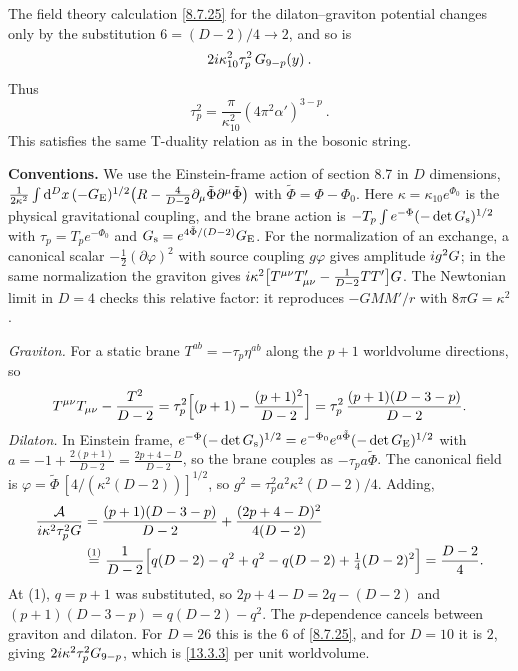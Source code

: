The field theory calculation \eqref{8.7.25} for the dilaton--graviton potential changes only by the substitution $6 = (D-2)/4 \to 2$, and so is
\begin{equation}
	2i\kappa_{10}^2\tau_p^2\,G_{9-p}(y) \:. \label{13.3.3}
\end{equation}
Thus
\begin{equation}
	\tau_p^2 = \frac{\pi}{\kappa_{10}^2}(4\pi^2\alpha')^{3-p} \:. \label{13.3.4}
\end{equation}
This satisfies the same T-duality relation as in the bosonic string.
\begin{tcolorbox}[breakable]
	\begin{remark}
		\textbf{Conventions.} We use the Einstein-frame action of section 8.7 in $D$ dimensions, $\frac{1}{2\kappa^2}\int\mathrm{d}^Dx\,(-G_{\rm E})^{1/2}\bigl(R-\frac{4}{D-2}\partial_\mu\tilde\Phi\partial^\mu\tilde\Phi\bigr)$ with $\tilde\Phi=\Phi-\Phi_0$. Here $\kappa=\kappa_{10}e^{\Phi_0}$ is the physical gravitational coupling, and the brane action is $-T_p\int e^{-\Phi}(-\det G_{\rm s})^{1/2}$ with $\tau_p=T_pe^{-\Phi_0}$ and $G_{\rm s}=e^{4\tilde\Phi/(D-2)}G_{\rm E}$. For the normalization of an exchange, a canonical scalar $-\frac12(\partial\varphi)^2$ with source coupling $g\varphi$ gives amplitude $i g^2G$; in the same normalization the graviton gives $i\kappa^2\bigl[T^{\mu\nu}T'_{\mu\nu}-\frac{1}{D-2}TT'\bigr]G$. The Newtonian limit in $D=4$ checks this relative factor: it reproduces $-GMM'/r$ with $8\pi G=\kappa^2$.

		\textit{Graviton.} For a static brane $T^{ab}=-\tau_p\eta^{ab}$ along the $p+1$ worldvolume directions, so
		\begin{align*}
			T^{\mu\nu}T_{\mu\nu}-\frac{T^2}{D-2} = \tau_p^2\Bigl[(p+1)-\frac{(p+1)^2}{D-2}\Bigr] = \tau_p^2\,\frac{(p+1)(D-3-p)}{D-2} .
		\end{align*}
		\textit{Dilaton.} In Einstein frame, $e^{-\Phi}(-\det G_{\rm s})^{1/2}=e^{-\Phi_0}e^{a\tilde\Phi}(-\det G_{\rm E})^{1/2}$ with $a=-1+\frac{2(p+1)}{D-2}=\frac{2p+4-D}{D-2}$, so the brane couples as $-\tau_pa\tilde\Phi$. The canonical field is $\varphi=\tilde\Phi\,[4/(\kappa^2(D-2))]^{1/2}$, so $g^2=\tau_p^2a^2\kappa^2(D-2)/4$. Adding,
		\begin{align*}
			\frac{\mathcal A}{i\kappa^2\tau_p^2G} &= \frac{(p+1)(D-3-p)}{D-2} + \frac{(2p+4-D)^2}{4(D-2)}\\
			&\overset{(1)}{=} \frac{1}{D-2}\Bigl[q(D-2)-q^2 + q^2 - q(D-2) + \tfrac14(D-2)^2\Bigr] = \frac{D-2}{4} .
		\end{align*}
		At (1), $q=p+1$ was substituted, so $2p+4-D=2q-(D-2)$ and $(p+1)(D-3-p)=q(D-2)-q^2$. The $p$-dependence cancels between graviton and dilaton. For $D=26$ this is the $6$ of \eqref{8.7.25}, and for $D=10$ it is $2$, giving $2i\kappa^2\tau_p^2G_{9-p}$, which is \eqref{13.3.3} per unit worldvolume.


\end{remark}
\end{tcolorbox}
